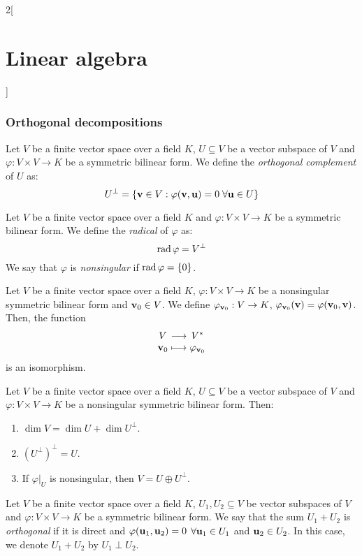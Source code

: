 \documentclass[../../../main_math.tex]{subfiles}
\begin{document}
\begin{multicols}{2}[\section{Linear algebra}]
  \subsubsection{Orthogonal decompositions}
  \begin{definition}\label{LA_singular}
    Let $V$ be a finite vector space over a field $K$, $U\subseteq V$ be a vector subspace of $V$ and $\varphi:V\times V\rightarrow K$ be a symmetric bilinear form. We define the \emph{orthogonal complement} of $U$ as: $$U^\perp=\{\boldsymbol{\mathrm{v}}\in V:\varphi(\boldsymbol{\mathrm{v}},\boldsymbol{\mathrm{u}})=0\;\forall\boldsymbol{\mathrm{u}}\in U\}$$
  \end{definition}
  \begin{definition}
    Let $V$ be a finite vector space over a field $K$ and $\varphi:V\times V\rightarrow K$ be a symmetric bilinear form. We define the \emph{radical} of $\varphi$ as: $$\operatorname{rad}\varphi=V^\perp$$ We say that $\varphi$ is \emph{nonsingular} if $\operatorname{rad}\varphi=\{0\}$.
  \end{definition}
  \begin{definition}
    Let $V$ be a finite vector space over a field $K$, $\varphi:V\times V\rightarrow K$ be a nonsingular symmetric bilinear form and $\boldsymbol{\mathrm{v}}_0\in V$. We define $\varphi_{\boldsymbol{\mathrm{v}}_0}:V\rightarrow K$, $\varphi_{\boldsymbol{\mathrm{v}}_0}(\boldsymbol{\mathrm{v}})=\varphi(\boldsymbol{\mathrm{v}}_0,\boldsymbol{\mathrm{v}})$. Then, the function
    $$\function{}{V}{V^*}{\vf{v}_0}{\varphi_{\vf{v}_0}}$$ is an isomorphism.
  \end{definition}
  \begin{definition}
    Let $V$ be a finite vector space over a field $K$, $U\subseteq V$ be a vector subspace of $V$ and $\varphi:V\times V\rightarrow K$ be a nonsingular symmetric bilinear form. Then:
    \begin{enumerate}
      \item $\dim V=\dim U+\dim U^\perp$.
      \item ${(U^\perp)}^\perp=U$.
      \item If $\varphi|_U$ is nonsingular, then $V=U\oplus U^\perp$.
    \end{enumerate}
  \end{definition}
  \begin{definition}
    Let $V$ be a finite vector space over a field $K$, $U_1,U_2\subseteq V$ be vector subspaces of $V$ and $\varphi:V\times V\rightarrow K$ be a symmetric bilinear form. We say that the sum $U_1+U_2$ is \emph{orthogonal} if it is direct and $\varphi(\boldsymbol{\mathrm{u}}_1,\boldsymbol{\mathrm{u}}_2)=0$ $\forall \boldsymbol{\mathrm{u}}_1\in U_1$ and $\boldsymbol{\mathrm{u}}_2\in U_2$. In this case, we denote $U_1+U_2$ by $U_1\perp U_2$.

\end{definition}
\end{multicols}
\end{document}
